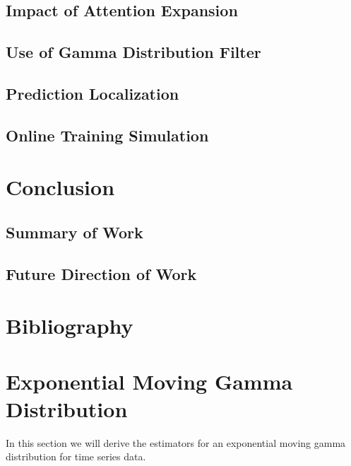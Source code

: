 \documentclass[12pt]{article}
\begin{document}
\subsection{Impact of Attention Expansion}

\subsection{Use of Gamma Distribution Filter}

\subsection{Prediction Localization}

\subsection{Online Training Simulation}

\section{Conclusion}

\subsection{Summary of Work}

\subsection{Future Direction of Work}

\pagebreak

\section{Bibliography}


\pagebreak


\appendix

\section{Exponential Moving Gamma Distribution}
In this section we will derive the estimators for an exponential moving gamma distribution for time series data.\\
\end{document}
